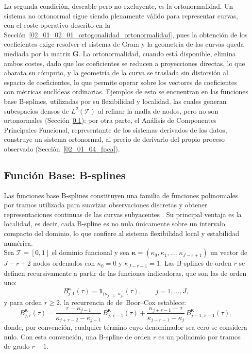 La segunda condición, deseable pero no excluyente, es la ortonormalidad. Un sistema no ortonormal sigue siendo plenamente válido para representar curvas, con el coste operativo descrito en la Sección~\ref{02_01_02_01_ortogonalidad_ortonormalidad}, pues la obtención de los coeficientes exige resolver el sistema de Gram y la geometría de las curvas queda mediada por la matriz $\mathbf{G}$. La ortonormalidad, cuando está disponible, elimina ambos costes, dado que los coeficientes se reducen a proyecciones directas, lo que abarata su cómputo, y la geometría de la curva se traslada sin distorsión al espacio de coeficientes, lo que permite operar sobre los vectores de coeficientes con métricas euclídeas ordinarias. Ejemplos de esto se encuentran en las funciones base B-splines, utilizadas por su flexibilidad y localidad, las cuales generan subespacios densos de $L^2(\mathcal{T})$ al refinar la malla de nodos, pero no son ortonormales (Sección~\ref{02_01_03_bsplines}); por otra parte, el Análisis de Componentes Principales Funcional, representante de los sistemas derivados de los datos, construye un sistema ortonormal, al precio de derivarlo del propio proceso observado (Sección~\ref{02_01_04_fpca}). 


\subsection{Función Base: B-splines}
\label{02_01_03_bsplines}
Las funciones base B-splines constituyen una familia de funciones polinomiales por tramos utilizada para suavizar observaciones discretas y obtener representaciones continuas de las curvas subyacentes \citep{02_01_ramsay2006functional}. Su principal ventaja es la localidad, es decir, cada B-spline es no nula únicamente sobre un intervalo compacto del dominio, lo que confiere al sistema flexibilidad local y estabilidad numérica.\\

Sea $\mathcal{T} = [0,1]$ el dominio funcional y sea $\boldsymbol{\kappa} = (\kappa_0, \kappa_1, \dots, \kappa_{J-r+1})$ un vector de $J-r+2$ nodos ordenados con $\kappa_0 = 0$ y $\kappa_{J-r+1} = 1$. Las B-splines de orden $r$ se definen recursivamente a partir de las funciones indicadoras, que son las de orden uno:
\begin{equation}
    B_{j,1}^{\boldsymbol{\kappa}}(\tau) =
    \mathbf{1}_{(\kappa_{j-1},\,\kappa_{j}]}(\tau),
    \qquad j = 1, \dots, J,
\end{equation}
y para orden $r \geq 2$, la recurrencia de de~Boor--Cox establece:
\begin{equation}
    B_{j,r}^{\boldsymbol{\kappa}}(\tau) =
    \frac{\tau - \kappa_{j-1}}{\kappa_{j+r-2} - \kappa_{j-1}}\,
    B_{j,\,r-1}^{\boldsymbol{\kappa}}(\tau)
    +
    \frac{\kappa_{j+r-1} - \tau}{\kappa_{j+r-1} - \kappa_{j}}\,
    B_{j+1,\,r-1}^{\boldsymbol{\kappa}}(\tau),
\end{equation}
donde, por convención, cualquier término cuyo denominador sea cero se considera nulo. Con esta convención, una B-spline de orden $r$ es un polinomio por tramos de grado $r-1$.\\

